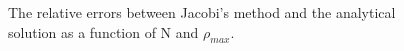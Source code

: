 \documentclass[%
reprint,
amsmath, 
amssymb, 
aps,]{revtex4-1}
\begin{document}
			\begin{figure}[!h]
\noindent{}
			\end{figure}
			\begin{figure}[!h]
\noindent{}
\caption{The relative errors between Jacobi's method and the analytical solution as a function of N and $\rho_{max}$. } \label{Nrho} 
			\end{figure}
\end{document}

